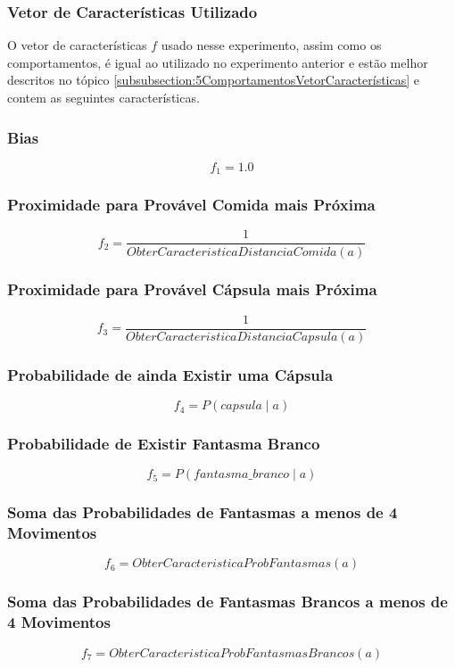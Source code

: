 \subsubsection{Vetor de Características Utilizado}

O vetor de características $ f $ usado nesse experimento, assim como os comportamentos, é igual ao utilizado no experimento anterior e estão melhor descritos no tópico \ref{subsubsection:5ComportamentosVetorCaracterísticas} e contem as seguintes características.

\subsubsection*{Bias}
$$ f_1 = 1.0 $$

\subsubsection*{Proximidade para Provável Comida mais Próxima}
$$ f_2 = \frac{1}{ObterCaracteristicaDistanciaComida \left( a \right)} $$

\subsubsection*{Proximidade para Provável Cápsula mais Próxima}
$$ f_3 = \frac{1}{ObterCaracteristicaDistanciaCapsula \left( a \right)} $$

\subsubsection*{Probabilidade de ainda Existir uma Cápsula}
$$ f_4 = P \left( capsula \mid a \right) $$

\subsubsection*{Probabilidade de Existir Fantasma Branco}
$$ f_5 = P \left( fantasma\_branco \mid a \right) $$

\subsubsection*{Soma das Probabilidades de Fantasmas a menos de 4 Movimentos}
$$ f_6 = ObterCaracteristicaProbFantasmas \left( a \right) $$

\subsubsection*{Soma das Probabilidades de Fantasmas Brancos a menos de 4 Movimentos}
$$ f_7 = ObterCaracteristicaProbFantasmasBrancos \left( a \right) $$



